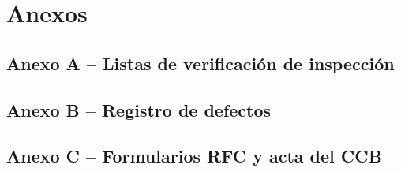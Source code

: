 \documentclass[journal,onecolumn]{IEEEtran}
\newcommand{\guia}[2]{%
	\begin{mdframed}[style=guia]
		\sloppy
		\noindent\textbf{Responsable: #1}\\[2pt]
		#2
	\end{mdframed}
}
\newif\ifguias
\let\guiaoriginal\guia
\renewcommand{\guia}[2]{\ifguias\guiaoriginal{#1}{#2}\fi}
\begin{document}
	\guia{Edson consolida -- Kevin y Jonathan aportan}{%
		El archivo \texttt{referencias.bib} ya contiene las 14 referencias de la guía. Regla:
		\textbf{toda referencia listada debe estar citada en el texto y viceversa}; el desajuste
		cuenta como defecto de rigor bibliográfico. \textbf{No agregar referencias inventadas}:
		autor, título, revista, DOI o páginas inexistentes son indicador~S3 (75\,\% de descuento).
		Si hace falta una fuente nueva, verificarla en el original antes de añadirla.}
	
	\appendix
	\section*{Anexos}
	
	\subsection*{Anexo A -- Listas de verificación de inspección}
	
	\guia{Kevin y Jonathan (una copia cada uno)}{%
		Una copia por inspector, firmada y fechada. Una fila por propiedad (ambigüedad, completitud,
		consistencia, verificabilidad, trazabilidad, factibilidad) con las columnas: pregunta de
		verificación, requisito revisado, cumple (S/N), evidencia y observación.
		Escanear o exportar a PDF y guardar en \texttt{02\_Inspeccion/AnexoA\_checklists/}.
		Insertar aquí como imagen o transcribir en tabla.}
	
	\subsection*{Anexo B -- Registro de defectos}
	
	\guia{Kevin (Integrante 2)}{%
		Referenciar la Tabla~\ref{tab:defectos} y el archivo
		\texttt{02\_Inspeccion/AnexoB\_registro\_defectos.xlsx}. Mantener el xlsx idéntico a la
		tabla del informe.}
	
	\subsection*{Anexo C -- Formularios RFC y acta del CCB}
	
	\guia{Kevin (RFC-01, RFC-03) -- Jonathan (RFC-02, acta) -- Edson (firmas)}{%
		Tres RFC completas en PDF y el acta firmada, en \texttt{03\_CCB/}. Los PDF del repositorio
		deben coincidir con lo transcrito en la sección 6.}
	
\end{document}
